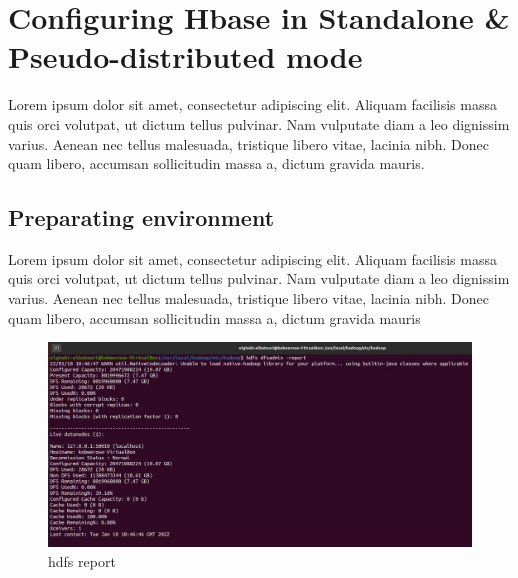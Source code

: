 \chapter{Configuring Hbase in Standalone & Pseudo-distributed mode}
\par Lorem ipsum dolor sit amet, consectetur adipiscing elit. Aliquam facilisis massa quis orci volutpat, ut dictum tellus pulvinar. Nam vulputate diam a leo dignissim varius. Aenean nec tellus malesuada, tristique libero vitae, lacinia nibh. Donec quam libero, accumsan sollicitudin massa a, dictum gravida mauris.
\begin{spacing}{1.2}
\section{Preparating environment }
\par Lorem ipsum dolor sit amet, consectetur adipiscing elit. Aliquam facilisis massa quis orci volutpat, ut dictum tellus pulvinar. Nam vulputate diam a leo dignissim varius. Aenean nec tellus malesuada, tristique libero vitae, lacinia nibh. Donec quam libero, accumsan sollicitudin massa a, dictum gravida mauris
\\
\begin{figure}[!htb] 
\begin{center} 
\includegraphics[width=1\linewidth]{Pictures/HBase/Configuring Hbase in Standalone & Pseudo-distributed mode/Preparating environment/hdfs report} 
\end{center} 
\caption{hdfs report} 
\end{figure}  \FloatBarrier
\\

\end{spacing}
